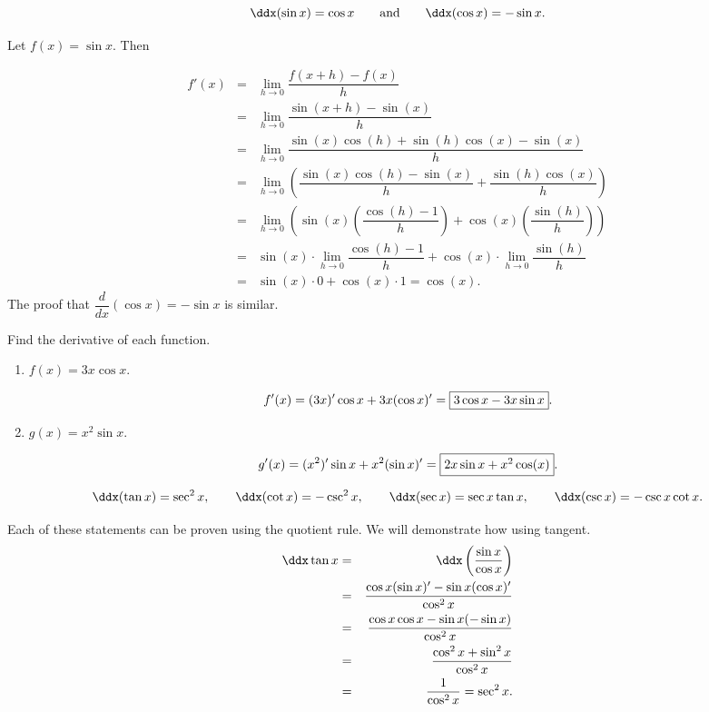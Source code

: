 \documentclass{book}
\begin{document}
\begin{Thm} \[\ddx(\sin x) = \cos x\qquad\text{and}\qquad \ddx(\cos x) = -\sin x.\]\end{Thm}
\begin{pf}
Let $f(x) = \sin x$. Then \vspace{-25pt}

\begin{eqnarray*}
f'(x) &=& \lim_{h\to 0} \dfrac{f(x+h) - f(x)}{h}\\
&=& \lim_{h\to 0} \dfrac{\sin(x+h) - \sin(x)}{h}\\
&=& \lim_{h\to 0} \dfrac{\sin(x)\cos(h) + \sin(h)\cos(x) - \sin(x)}{h}\\
&=& \lim_{h\to 0} \left(\dfrac{\sin(x)\cos(h) - \sin(x)}{h} + \dfrac{\sin(h)\cos(x)}{h}\right)\\
&=& \lim_{h\to 0} \left(\sin(x)\left(\dfrac{\cos(h) - 1}{h}\right) + \cos(x)\left(\dfrac{\sin(h)}{h}\right)\right)\\
&=& \sin(x)\cdot \lim_{h\to 0} \dfrac{\cos(h) - 1}{h} + \cos(x)\cdot \lim_{h\to 0}\dfrac{\sin(h)}{h}\\
&=& \sin(x) \cdot 0 + \cos(x) \cdot 1  = \cos(x).
\end{eqnarray*} The proof that $\dfrac{d}{dx}(\cos x) = -\sin x$ is similar.
\end{pf}\vs

\begin{Exam} Find the derivative of each function.
\begin{enumerate}
\item $f(x) = 3x\cos x$.

\[f'(x) = (3x)'\cos x + 3x(\cos x)' = \fbox{$3\cos x - 3x\sin x$}.\]\vs

\item $g(x) = x^2\sin x$.

\[g'(x) = (x^2)'\sin x + x^2(\sin x)' = \fbox{$2x\sin x + x^2\cos (x)$}. \]
\end{enumerate}
\end{Exam}\vs

\begin{Thm}
\[\ddx(\tan x) = \sec^2 x,\qquad \ddx(\cot x) = -\csc^2 x, \qquad \ddx(\sec x) = \sec x\tan x, \qquad \ddx(\csc x) = -\csc x\cot x.\]
\end{Thm}
\begin{pf}  Each of these statements can be proven using the quotient rule. We will demonstrate how using tangent.
\begin{eqnarray*}
\ddx \tan x &=& \ddx \left(\dfrac{\sin x}{\cos x}\right)\\
&=& \dfrac{\cos x(\sin x)' - \sin x(\cos x)'}{\cos^2 x}\\
&=& \dfrac{\cos x \cos x - \sin x(-\sin x)}{\cos^2 x}\\
&=& \dfrac{ \cos^2 x + \sin^2 x}{\cos^2 x}\\
&= & \dfrac{1}{\cos^2 x} = \sec^2 x.
\end{eqnarray*}
\end{pf}\vs
\end{document}
